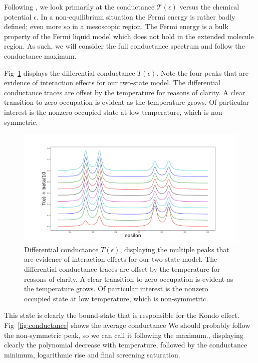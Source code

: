 \documentclass{article}
\begin{document}
\begin{multicols}{2}
        Following \citet{meir}, we look primarily at the conductance $\mathscr{T}(\epsilon)$ versus the chemical potential $\epsilon$. In a non-equilibrium situation the Fermi energy is rather badly defined; even more so in a mesoscopic region. The Fermi energy is a bulk property of the Fermi liquid model which does not hold in the extended molecule region. As such, we will consider the full conductance spectrum and follow the conductance maximum.
        
        Fig~\ref{fig:transplot} displays the differential conductance $T(\epsilon)$. Note the four peaks that are evidence of interaction effects for our two-state model. The differential conductance traces are offset by the temperature for reasons of clarity. A clear transition to zero-occupation is evident as the temperature grows. Of particular interest is the nonzero occupied state at low temperature, which is non-symmetric.
        
        \begin{figure}[b]
            \centering
            \includegraphics[width=\textwidth]{transportPlot}
            \caption{\label{fig:transplot} Differential conductance $T(\epsilon)$, displaying the multiple peaks that are evidence of interaction effects for our two-state model. The differential conductance traces are offset by the temperature for reasons of clarity. A clear transition to zero-occupation is evident as the temperature grows. Of particular interest is the nonzero occupied state at low temperature, which is non-symmetric.}
        \end{figure}
        
        This state is clearly the bound-state that is responsible for the Kondo effect. Fig~\ref{fig:conductance} shows the average conductance {\color{red} We should probably follow the non-symmetric peak, so we can call it following the maximum.}, displaying clearly the polynomial decrease with temperature, followed by the conductance minimum, logarithmic rise and final screening saturation.
        

\end{multicols}
\end{document}
